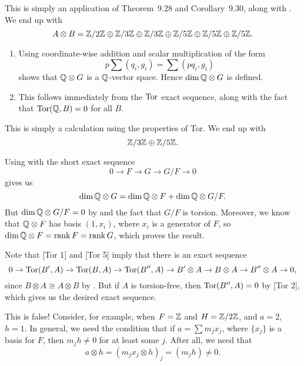 \documentclass[../../solutions.tex]{subfiles}
\begin{document}
\begin{exercise} \leavevmode
This is simply an application of Theorem~9.28 and Corollary~9.30, along with .
We end up with
\[A\otimes B=\mathbb{Z}/2\mathbb{Z}\oplus\mathbb{Z}/3\mathbb{Z}\oplus\mathbb{Z}/3\mathbb{Z}\oplus\mathbb{Z}/5\mathbb{Z}\oplus\mathbb{Z}/5\mathbb{Z}\oplus\mathbb{Z}/5\mathbb{Z}.\]
\end{exercise}

\begin{exercise} \leavevmode
\begin{enumerate}
\item 
Using coordinate-wise addition and scalar multiplication of the form
\[p\sum(q_i,g_i)=\sum(pq_i,g_i)\]
shows that $\mathbb{Q}\otimes G$ is a $\mathbb{Q}$-vector space.
Hence $\dim\mathbb{Q}\otimes G$ is defined.

\item
This follows immediately from the $\operatorname{Tor}$ exact sequence, along with the fact that $\operatorname{Tor}(\mathbb{Q},B)=0$ for all $B$.
\end{enumerate}
\end{exercise}

\begin{exercise} \leavevmode
This is simply a calculation using the properties of Tor.
We end up with
\[\mathbb{Z}/3\mathbb{Z}\oplus\mathbb{Z}/5\mathbb{Z}.\]
\end{exercise}

\begin{exercise} \leavevmode
Using  with the short exact sequence
\[0\to F\to G\to G/F\to0\]
gives us
\[\dim\mathbb{Q}\otimes G=\dim\mathbb{Q}\otimes F+\dim\mathbb{Q}\otimes G/F.\]
But $\dim\mathbb{Q}\otimes G/F=0$ by  and the fact that $G/F$ is torsion.
Moreover, we know that $\mathbb{Q}\otimes F$ has basis $(1,x_i)$, where $x_i$ is a generator of $F$, so $\dim\mathbb{Q}\otimes F=\operatorname{rank} F=\operatorname{rank} G$, which proves the result.
\end{exercise}

\begin{exercise} \leavevmode
Note that [Tor 1] and [Tor 5] imply that there is an exact sequence
\[0\to\operatorname{Tor}(B',A)\to\operatorname{Tor}(B,A)\to\operatorname{Tor}(B'',A)\to B'\otimes A\to B\otimes A\to B''\otimes A\to0,\]
since $B\otimes A\cong A\otimes B$ by .
But if $A$ is torsion-free, then $\operatorname{Tor}(B'',A)=0$ by [Tor 2], which gives us the desired exact sequence.
\end{exercise}

\begin{exercise} \leavevmode
This is false!
Consider, for example, when $F=\mathbb{Z}$ and $H=\mathbb{Z}/2\mathbb{Z}$, and $a=2$, $h=1$.
In general, we need the condition that if $a=\sum m_jx_j$, where $\{x_j\}$ is a basis for $F$, then $m_jh\ne0$ for at least some $j$.
After all, we need that
\[a\otimes h=(m_jx_j\otimes h)_j=(m_jh)\ne0.\]
\end{exercise}
\end{document}
